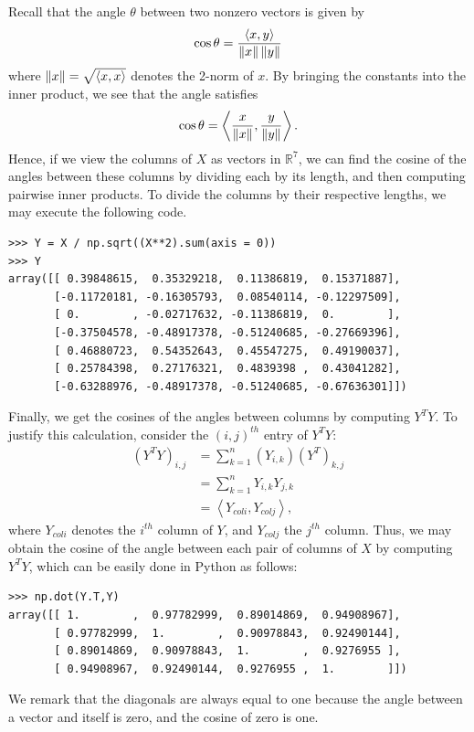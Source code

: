 Recall that the angle $\theta$ between two nonzero
vectors is given by
\[
\cos{\theta} = \frac{\langle x,y \rangle}{\left\lVert x\right\rVert\left\lVert y\right\rVert}
\]
where $\left\lVert x\right\rVert = \sqrt{\langle x,x \rangle}$ denotes the 2-norm of $x$.
By bringing the constants into the inner product, we see that the angle satisfies
\[
\cos{\theta} = \left\langle\frac{x}{\left\lVert x\right\rVert},\frac{y}{\left\lVert y\right\rVert}\right\rangle.
\]
Hence, if we view the columns of $X$ as vectors in $\mathbb{R}^7$, we can find the cosine of the angles between these columns by dividing each
by its length, and then computing pairwise inner products. To divide the columns by their respective lengths, we may execute the following
code.
\begin{lstlisting}
>>> Y = X / np.sqrt((X**2).sum(axis = 0))
>>> Y
array([[ 0.39848615,  0.35329218,  0.11386819,  0.15371887],
       [-0.11720181, -0.16305793,  0.08540114, -0.12297509],
       [ 0.        , -0.02717632, -0.11386819,  0.        ],
       [-0.37504578, -0.48917378, -0.51240685, -0.27669396],
       [ 0.46880723,  0.54352643,  0.45547275,  0.49190037],
       [ 0.25784398,  0.27176321,  0.4839398 ,  0.43041282],
       [-0.63288976, -0.48917378, -0.51240685, -0.67636301]])
\end{lstlisting}

Finally, we get the cosines of the angles between columns by computing $Y^T Y$. To justify this calculation, consider
the $(i,j)^{th}$ entry of $Y^T Y$:
\begin{align*}
(Y^T Y)_{i,j} &= \sum_{k=1}^n (Y_{i,k})(Y^T)_{k,j} \\
&= \sum_{k=1}^n Y_{i,k}Y_{j,k} \\
&= \left\langle Y_{col i}, Y_{col j} \right\rangle,
\end{align*}
where $Y_{col i}$ denotes the $i^{th}$ column of $Y$, and $Y_{col j}$ the $j^{th}$ column.
Thus, we may obtain the cosine of the angle between each pair of columns of $X$ by computing $Y^T Y$,
which can be easily done in Python as follows:
\begin{lstlisting}
>>> np.dot(Y.T,Y)
array([[ 1.        ,  0.97782999,  0.89014869,  0.94908967],
       [ 0.97782999,  1.        ,  0.90978843,  0.92490144],
       [ 0.89014869,  0.90978843,  1.        ,  0.9276955 ],
       [ 0.94908967,  0.92490144,  0.9276955 ,  1.        ]])
\end{lstlisting}

We remark that the diagonals are always equal to one because the angle between a vector and itself is zero, and the cosine of zero is one.


